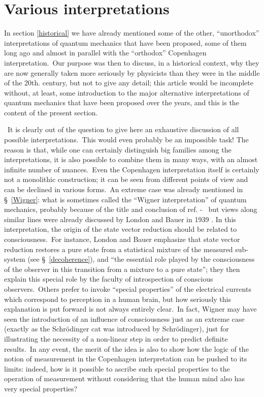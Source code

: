 \documentclass[12pt,onecolumn]{article}%
\begin{document}
\section{Various interpretations}

\label{other}

In section \ref{historical} we have already mentioned some of the other,
``unorthodox'' interpretations of quantum mechanics that have been proposed,
some of them long ago and almost in parallel with the ``orthodox'' Copenhagen
interpretation.\ Our purpose was then to discuss, in a historical context, why
they are now generally taken more seriously by physicists than they were in
the middle of the 20th. century, but not to give any detail; this article
would be incomplete without, at least, some introduction to the major
alternative interpretations of quantum mechanics that have been proposed over
the years, and this is the content of the present section.

\ It is clearly out of the question to give here an exhaustive discussion of
all possible interpretations.\ This would even probably be an impossible task!
The reason is that, while one can certainly distinguish big families among the
interpretations, it is also possible to combine them in many ways, with an
almost infinite number of nuances.\ Even the Copenhagen interpretation itself
is certainly not a monolithic construction; it can be seen from different
points of view and can be declined in various forms.\ An extreme case was
already mentioned in \S \ \ref{Wigner}: what is sometimes called the ``Wigner
interpretation'' of quantum mechanics, probably because of the title and
conclusion of ref. \cite{Wigner-friend} - \ but views along similar lines were
already discussed by London and Bauer in 1939 \cite{London-Bauer}. In this
interpretation, the origin of the state vector reduction should be related to
consciousness.\ For instance, London and Bauer emphasize that state vector
reduction restores a pure state from a statistical mixture of the measured
sub-system (see \S \ \ref{decoherence}), and ``the essential role played by
the consciousness of the observer in this transition from a mixture to a pure
state''; they then explain this special role by the faculty of introspection
of conscious observers.\ Others prefer to invoke ``special properties'' of the
electrical currents which correspond to perception in a human brain, but how
seriously this explanation is put forward is not always entirely clear.\ In
fact, Wigner may have seen the introduction of an influence of consciousness
just as an extreme case (exactly as the Schr\"{o}dinger cat was introduced by
Schr\"{o}dinger), just for illustrating the necessity of a non-linear step in
order to predict definite results.\ In any event, the merit of the idea is
also to show how the logic of the notion of measurement in the Copenhagen
interpretation can be pushed to its limits: indeed, how is it possible to
ascribe such special properties to the operation of measurement without
considering that the human mind also has very special properties?
\end{document}
